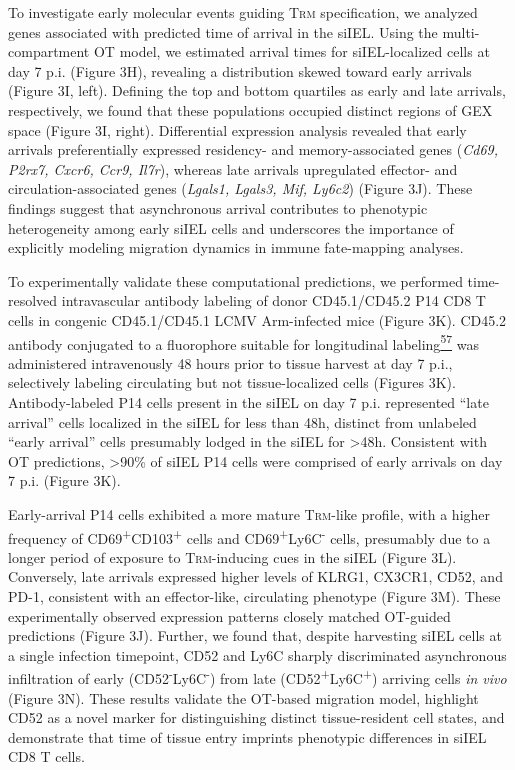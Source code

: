 To investigate early molecular events guiding T\textsc{rm}
specification, we analyzed genes associated with predicted time of
arrival in the siIEL. Using the multi-compartment OT model, we estimated
arrival times for siIEL-localized cells at day 7 p.i. (Figure 3H),
revealing a distribution skewed toward early arrivals (Figure 3I, left).
Defining the top and bottom quartiles as early and late arrivals,
respectively, we found that these populations occupied distinct regions
of GEX space (Figure 3I, right). Differential expression analysis
revealed that early arrivals preferentially expressed residency- and
memory-associated genes (\emph{Cd69, P2rx7, Cxcr6, Ccr9, Il7r}), whereas
late arrivals upregulated effector- and circulation-associated genes
(\emph{Lgals1, Lgals3, Mif, Ly6c2}) (Figure 3J). These findings suggest
that asynchronous arrival contributes to phenotypic heterogeneity among
early siIEL cells and underscores the importance of explicitly modeling
migration dynamics in immune fate-mapping analyses.

To experimentally validate these computational predictions, we performed
time-resolved intravascular antibody labeling of donor CD45.1/CD45.2 P14
CD8 T cells in congenic CD45.1/CD45.1 LCMV Arm-infected mice (Figure
3K). CD45.2 antibody conjugated to a fluorophore suitable for
longitudinal
labeling\href{https://sciwheel.com/work/citation?ids=16725712\&pre=\&suf=\&sa=0\&dbf=0}{\textsuperscript{57}}
was administered intravenously 48 hours prior to tissue harvest at day 7
p.i., selectively labeling circulating but not tissue-localized cells
(Figures 3K). Antibody-labeled P14 cells present in the siIEL on day 7
p.i. represented ``late arrival'' cells localized in the siIEL for less
than 48h, distinct from unlabeled ``early arrival'' cells presumably
lodged in the siIEL for \textgreater{}48h. Consistent with OT
predictions, \textgreater{}90\% of siIEL P14 cells were comprised of
early arrivals on day 7 p.i. (Figure 3K).

Early-arrival P14 cells exhibited a more mature T\textsc{rm}-like
profile, with a higher frequency of
CD69\textsuperscript{+}CD103\textsuperscript{+} cells and
CD69\textsuperscript{+}Ly6C\textsuperscript{-} cells, presumably due to
a longer period of exposure to T\textsc{rm}-inducing cues in the siIEL
(Figure 3L). Conversely, late arrivals expressed higher levels of KLRG1,
CX3CR1, CD52, and PD-1, consistent with an effector-like, circulating
phenotype (Figure 3M). These experimentally observed expression patterns
closely matched OT-guided predictions (Figure 3J). Further, we found
that, despite harvesting siIEL cells at a single infection timepoint,
CD52 and Ly6C sharply discriminated asynchronous infiltration of early
(CD52\textsuperscript{-}Ly6C\textsuperscript{-}) from late
(CD52\textsuperscript{+}Ly6C\textsuperscript{+}) arriving cells \emph{in
vivo} (Figure 3N). These results validate the OT-based migration model,
highlight CD52 as a novel marker for distinguishing distinct
tissue-resident cell states, and demonstrate that time of tissue entry
imprints phenotypic differences in siIEL CD8 T cells.


